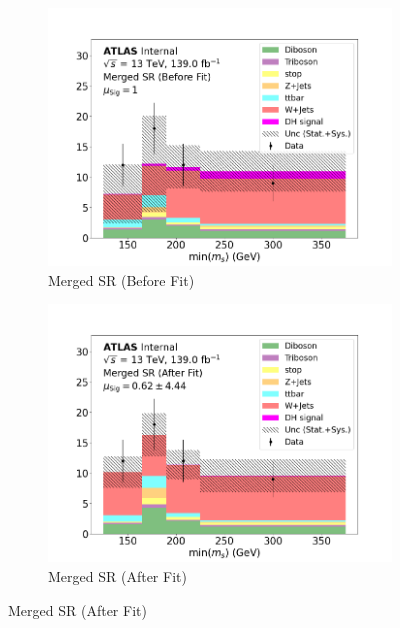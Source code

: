 \begin{figure}[h]
  \centering
  \begin{subfigure}{0.45\textwidth}
    \includegraphics[width=\textwidth]{Figures/8/MonoSlep_monoSWWsemilep_zp2900_dm200_dh310/SR_Merged_before.pdf}
    \caption{Merged SR (Before Fit)}\label{fig:before_SR_merged_MonoSlep_monoSWWsemilep_zp2900_dm200_dh310}
  \end{subfigure} \hspace{1em}
  \begin{subfigure}{0.45\textwidth}
    \includegraphics[width=\textwidth]{Figures/8/MonoSlep_monoSWWsemilep_zp2900_dm200_dh310/SR_Merged_after.pdf}
    \caption{Merged SR (After Fit)}\label{fig:after_SR_resolved_MonoSlep_monoSWWsemilep_zp2900_dm200_dh310}

\end{subfigure}
\end{figure}
